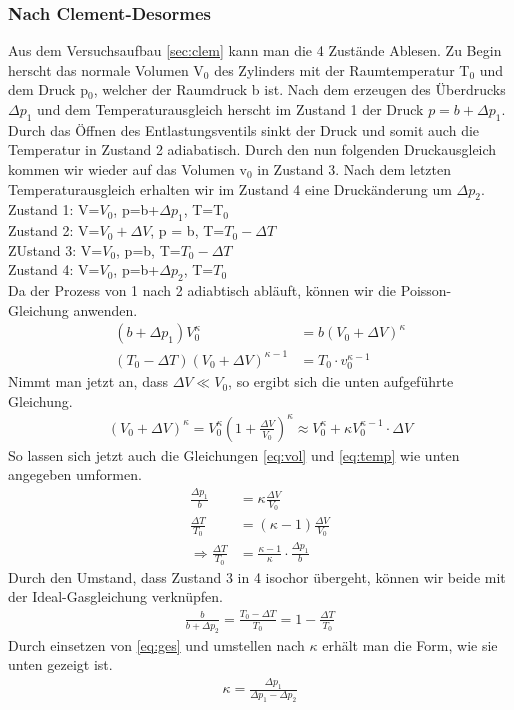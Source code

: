 \documentclass[12pt,a4paper,titlepage,headinclude,bibtotoc]{scrartcl}
\begin{document}
\subsubsection{Nach Clement-Desormes}
Aus dem Versuchsaufbau \ref{sec:clem} kann man die 4 Zustände Ablesen.
Zu Begin herscht das normale Volumen V$_0$ des Zylinders mit der Raumtemperatur T$_0$ und dem Druck p$_0$, welcher der Raumdruck b ist.
Nach dem erzeugen des Überdrucks $\Delta p_1$ und dem Temperaturausgleich herscht im Zustand 1 der Druck $p=b+\Delta p_1$.
Durch das Öffnen des Entlastungsventils sinkt der Druck und somit auch die Temperatur in Zustand 2 adiabatisch.
Durch den nun folgenden Druckausgleich kommen wir wieder auf das Volumen v$_0$ in Zustand 3.
Nach dem letzten Temperaturausgleich erhalten wir im Zustand 4 eine Druckänderung um $\Delta p_2$.\\
Zustand 1: V=$V_0$, p=b+$\Delta p_1$, T=T$_0$\\
Zustand 2: V=$V_0+\Delta V$, p = b, T=$T_0-\Delta T$\\
ZUstand 3: V=$V_0$, p=b, T=$T_0-\Delta T$\\
Zustand 4: V=$V_0$, p=b+$\Delta p_2$, T=$T_0$\\

Da der Prozess von 1 nach 2 adiabtisch abläuft, können wir die Poisson-Gleichung anwenden.\cite[S. 319]{demtroeder}
\begin{align}
	(b+\Delta p_1)V_0^\kappa &= b(V_0 + \Delta V)^\kappa\label{eq:vol}\\
	(T_0-\Delta T)(V_0+\Delta V)^{\kappa-1}&=T_0\cdot v_0^{\kappa-1}\label{eq:temp}
\end{align}
Nimmt man jetzt an, dass $\Delta V \ll V_0$, so ergibt sich die unten aufgeführte Gleichung.
\begin{align}
	(V_0+\Delta V)^\kappa=V_0^\kappa\left(1+\frac{\Delta V}{V_0}\right)^\kappa \approx V_0^\kappa+\kappa V_0^{\kappa-1}\cdot \Delta V
\end{align}
So lassen sich jetzt auch die Gleichungen \eqref{eq:vol} und \eqref{eq:temp} wie unten angegeben umformen.
\begin{align}
	\frac{\Delta p_1}{b}&=\kappa\frac{\Delta V}{V_0}\\
	\frac{\Delta T}{T_0}&=(\kappa-1)\frac{\Delta V}{V_0}\\
	\Rightarrow \frac{\Delta T}{T_0}&=\frac{\kappa -1}{\kappa}\cdot\frac{\Delta p_1}{b}\label{eq:ges}
\end{align}
Durch den Umstand, dass Zustand 3 in 4 isochor übergeht, können wir beide mit der Ideal-Gasgleichung verknüpfen.
\begin{align}
	\frac{b}{b+\Delta p_2}=\frac{T_0-\Delta T}{T_0}=1-\frac{\Delta T}{T_0}
\end{align}
Durch einsetzen von \eqref{eq:ges} und umstellen nach $\kappa$ erhält man die Form, wie sie unten gezeigt ist.
\begin{align}
	\kappa=\frac{\Delta p_1}{\Delta p_1-\Delta p_2}\label{eq:clem}
\end{align}
\end{document}
